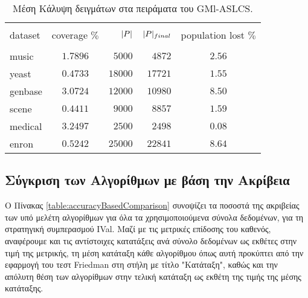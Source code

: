 \begin{table}[!h]
\begin{center}
    \caption{Μέση Κάλυψη δειγμάτων στα πειράματα του GMl-ASLCS.}
	\label{table:gmlaslcsCoverage}
    \begin{tabular}{l|crrc}
    \hline \\ [-2ex]
    dataset & coverage $\%$     & $\lvert P\rvert$ & $\lvert P\rvert_{final}$ & population lost $\%$ \\
    \hline \\ [-2ex]
    music   & $1.7896$       	& $5000$    & $4872$            & $2.56$               \\
    yeast   & $0.4733$        	& $18000$   & $17721$           & $1.55$               \\
    genbase & $3.0724$        	& $12000$   & $10980$           & $8.50$                \\
    scene   & $0.4411$ 		  	& $9000$    & $8857$            & $1.59$               \\
    medical & $3.2497$  		& $2500$    & $2498$            & $0.08$               \\
    enron   & $0.5242$ 			& $25000$   & $22841$           & $8.64$               \\ 
    \hline
    \end{tabular}
\end{center}
\end{table}



\subsection{Σύγκριση των Αλγορίθμων με βάση την Ακρίβεια}
\label{subsec:accBasedComparison}
Ο Πίνακας \ref{table:accuracyBasedComparison} συνοψίζει τα ποσοστά της ακριβείας των υπό μελέτη αλγορίθμων για όλα τα χρησιμοποιούμενα σύνολα δεδομένων, για τη στρατηγική συμπερασμού IVal. Μαζί με τις μετρικές επίδοσης του καθενός, αναφέρουμε και τις αντίστοιχες κατατάξεις ανά σύνολο δεδομένων ως εκθέτες στην τιμή της μετρικής, τη μέση κατάταξη κάθε αλγορίθμου όπως αυτή προκύπτει από την εφαρμογή του τεστ Friedman στη στήλη με τίτλο "Κατάταξη", καθώς και την απόλυτη θέση των αλγορίθμων στην τελική κατάταξη ως εκθέτη της τιμής της μέσης κατάταξης.


